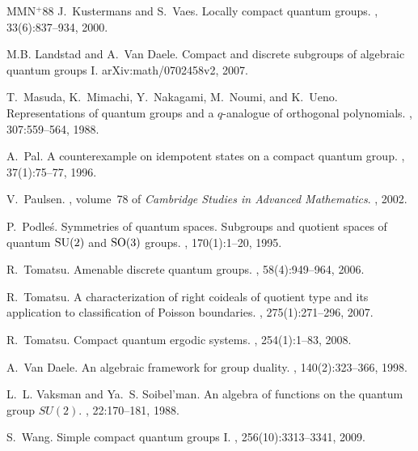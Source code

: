 \documentclass[12pt]{amsart}
\theoremstyle{definition}
\theoremstyle{remark}
\numberwithin{equation}{section}
\begin{document}
\begin{thebibliography}{MMN{{$^{{+}}$}}88}
J.~Kustermans and S.~Vaes.
\newblock Locally compact quantum groups.
, 33(6):837--934, 2000.

M.B. Landstad and A.~Van Daele.
\newblock Compact and discrete subgroups of algebraic quantum groups {I}.
\newblock arXiv:math/0702458v2, 2007.

T.~Masuda, K.~Mimachi, Y.~Nakagami, M.~Noumi, and K.~Ueno.
\newblock Representations of quantum groups and a $q$-analogue of orthogonal
  polynomials.
, 307:559--564, 1988.

A.~Pal.
\newblock A counterexample on idempotent states on a compact quantum group.
, 37(1):75--77, 1996.

V.~Paulsen.
, volume~78 of
  {\em Cambridge Studies in Advanced Mathematics}.
, 2002.

P.~Podle{\'s}.
\newblock Symmetries of quantum spaces. {S}ubgroups and quotient spaces of
  quantum {${\rm SU}(2)$} and {${\rm SO}(3)$} groups.
, 170(1):1--20, 1995.

R.~Tomatsu.
\newblock Amenable discrete quantum groups.
, 58(4):949--964, 2006.

R.~Tomatsu.
\newblock A characterization of right coideals of quotient type and its
  application to classification of {P}oisson boundaries.
, 275(1):271--296, 2007.

R.~Tomatsu.
\newblock Compact quantum ergodic systems.
, 254(1):1--83, 2008.

A.~Van Daele.
\newblock An algebraic framework for group duality.
 , 140(2):323--366, 1998.
  
   

L.~L. Vaksman and Ya.~S. Soibel'man.
\newblock An algebra of functions on the quantum group {$SU(2)$}.
, 22:170--181, 1988.

S.~Wang.
\newblock Simple compact quantum groups I. , 256(10):3313--3341, 2009.


\end{thebibliography}
\end{document}
